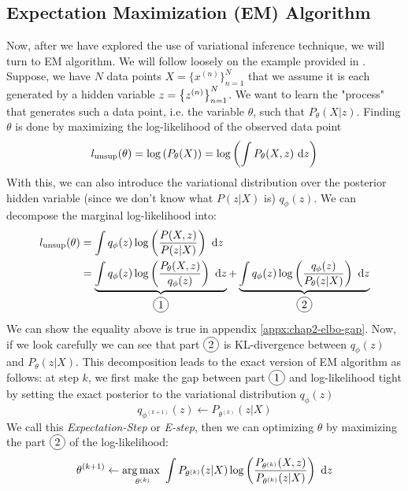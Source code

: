 \subsection{Expectation Maximization (EM) Algorithm}
\label{sec:chap2-em-algo}
Now, after we have explored the use of variational inference technique, we will turn to EM algorithm. We will follow loosely on the example provided in \cite{fellows2019virel}. Suppose, we have $N$ data points $X = \{x^{(n)}\}^N_{n=1}$ that we assume it is each generated by a hidden variable $z = \left\{ z^{(n)} \right\}^N_{n=1}$. We want to learn the "process" that generates such a data point, i.e. the variable $\theta$, such that $P_{\theta}(X | z)$. Finding $\theta$ is done by maximizing the log-likelihood of the observed data point
\begin{equation}
    l_{\text{unsup}}(\theta) = \log \left( P_{\theta}(X) \right) = \log\left( \int P_{\theta}(X, z) \ \mathrm{d} z \right)
\end{equation}
With this, we can also introduce the variational distribution over the posterior hidden variable (since we don't know what $P(z | X)$ is) $q_{\phi}(z)$. We can decompose the marginal log-likelihood into:
\begin{equation}
    \begin{aligned}
        l_{\text{unsup}}(\theta) &= \int q_{\phi}(z) \log \bracka{\frac{P(X, z)}{P(z | X)}} \dby z \\
        &= \underbrace{\int q_{\phi}(z) \log \bracka{\frac{P_{\theta}(X, z)}{q_{\phi}(z)}} \dby z}_{\circled{1}} + \underbrace{\int q_{\phi}(z) \log \bracka{\frac{q_{\phi}(z)}{P_{\theta}(z | X)}} \dby z}_{\circled{2}}
    \end{aligned}
\end{equation}
We can show the equality above is true in appendix \ref{appx:chap2-elbo-gap}. Now, if we look carefully we can see that part $\circled{2}$ is KL-divergence between $q_{\phi}(z)$ and $P_{\theta}(z | X)$. This decomposition leads to the exact version of EM algorithm as follows: at step $k$, we first make the gap between part $\circled{1}$ and log-likelihood tight by setting the exact posterior to the variational distribution $q_{\phi}(z)$
\begin{equation}
    q_{\phi^{(k+1)}}(z) \leftarrow P_{\theta^{(k)}}(z | X)
\end{equation}
We call this \textit{Expectation-Step} or \textit{E-step}, then we can optimizing $\theta$ by maximizing the part $\circled{2}$ of the log-likelihood:
\begin{equation}
    \theta^{(k+1)} \leftarrow \underset{\theta^{(k)}}{\arg\max \ }  \int P_{\theta^{(k)}}(z | X) \log \left( \frac{P_{\theta^{(k)}}(X, z)}{P_{\theta^{(k)}}(z | X)} \right) \ \mathrm{d} z 
\end{equation}
